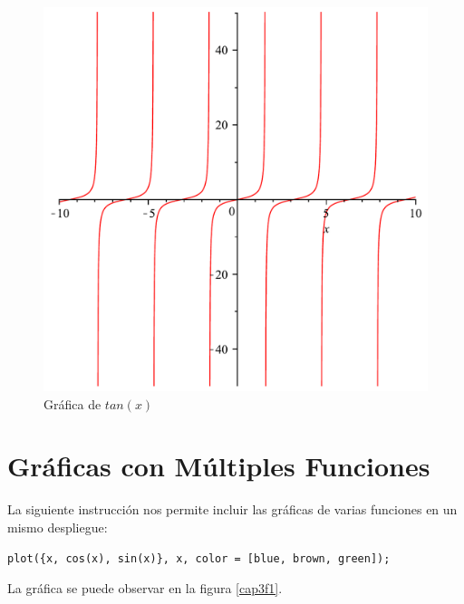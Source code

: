 \documentclass[letterpaper,12pt]{book}
\begin{document}
\begin{figure}[h!]
\centering
\includegraphics[scale=0.4]{grafica04.pdf}
\caption{Gráfica de $tan (x)$}\label{cap2f1}
\end{figure}

\chapter{Gráficas con Múltiples Funciones}

La siguiente instrucción nos permite incluir las gráficas de varias funciones en un mismo despliegue:

\begin{verbatim}
plot({x, cos(x), sin(x)}, x, color = [blue, brown, green]);
\end{verbatim}

La gráfica se puede observar en la figura \ref{cap3f1}.
\end{document}
